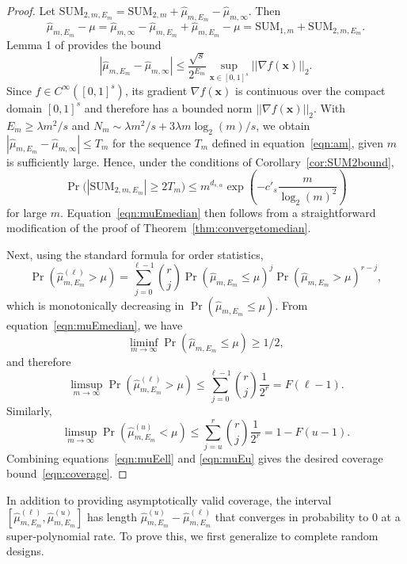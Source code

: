 \documentclass{article}
\theoremstyle{definition}
\renewcommand{\le}{\leqslant}
\renewcommand{\leq}{\leqslant}
\renewcommand{\geq}{\geqslant}
\newcommand{\bsx}{\boldsymbol{x}}
\begin{document}
\begin{proof}
Let $\mathrm{SUM}_{2,m,E_m}=\mathrm{SUM}_{2,m}+\hat{\mu}_{m,E_m}-\hat{\mu}_{m,\infty}$. Then 
$$\hat{\mu}_{m,E_m}-\mu=\hat{\mu}_{m,\infty}-\hat{\mu}_{m,E_m}+\hat{\mu}_{m,E_m}-\mu=\mathrm{SUM}_{1,m}+\mathrm{SUM}_{2,m,E_m}.$$ Lemma 1 of \cite{superpolymulti} provides the bound
\begin{equation}\label{eqn:muE}
    |\hat{\mu}_{m,E_m}-\hat{\mu}_{m,\infty}|\leq \frac{\sqrt{s}}{2^{E_m}}\sup_{\bsx\in [0,1]^s}||\nabla f(\bsx)||_2.
\end{equation}
Since $f\in C^{\infty}([0,1]^s)$, its gradient $\nabla f(\bsx)$ is continuous over the compact domain $[0,1]^s$ and therefore has a bounded norm $||\nabla f(\bsx)||_2$. With $E_m\geq \lambda m^2/s$ and $N_m\sim \lambda m^2/s+ 3\lambda m\log_2(m)/s$, we obtain $|\hat{\mu}_{m,E_m}-\hat{\mu}_{m,\infty}|\leq T_m$ for the sequence $T_m$ defined in equation~\eqref{eqn:am}, given $m$ is sufficiently large. Hence, under the conditions of Corollary~\ref{cor:SUM2bound},
\begin{equation*}
\Pr\Big(|\mathrm{SUM}_{2,m,E_m}|\geq 2T_m\Big)\leq m^{d_{s,\alpha}}\exp\left(-c'_s \frac{m}{\log_2(m)^2}\right)
\end{equation*}
for large $m$.
Equation~\eqref{eqn:muEmedian} then follows from a straightforward modification of the proof of Theorem~\ref{thm:convergetomedian}.

Next, using the standard formula for order statistics,
$$\Pr(\hat{\mu}^{(\ell)}_{m,E_m}>\mu)=\sum_{j=0}^{\ell-1} \binom{r}{j} \Pr(\hat{\mu}_{m,E_m} \le \mu)^{j}\Pr(\hat{\mu}_{m,E_m} > \mu)^{r-j},$$
which is monotonically decreasing in $\Pr(\hat{\mu}_{m,E_m} \le \mu)$. From equation~\eqref{eqn:muEmedian}, we have
$$\liminf_{m\to\infty}\Pr(\hat{\mu}_{m,E_m} \le \mu)\geq 1/2,$$
and therefore
\begin{equation}\label{eqn:muEell}
    \limsup_{m\to\infty}\Pr(\hat{\mu}^{(\ell)}_{m,E_m}>\mu)\leq \sum_{j=0}^{\ell-1} \binom{r}{j}\frac{1}{2^r}=F(\ell-1).
\end{equation}
Similarly, 
\begin{equation}\label{eqn:muEu}
    \limsup_{m\to\infty}\Pr(\hat{\mu}^{(u)}_{m,E_m}<\mu)\leq \sum_{j=u}^{r} \binom{r}{j}\frac{1}{2^r}=1-F(u-1).
\end{equation}
Combining equations~\eqref{eqn:muEell} and \eqref{eqn:muEu} gives the desired coverage bound~\eqref{eqn:coverage}.
\end{proof}

In addition to providing asymptotically valid coverage, the interval $[\hat{\mu}^{(\ell)}_{m,E_m},\hat{\mu}^{(u)}_{m,E_m}]$ has length $\hat{\mu}^{(u)}_{m,E_m}-\hat{\mu}^{(\ell)}_{m,E_m}$ that converges in probability to $0$ at a super‑polynomial rate. To prove this, we first generalize \cite[Theorem 2]{superpolymulti} to complete random designs.
\end{document}
